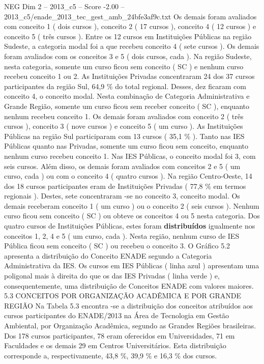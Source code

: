 \begin{textsample}{NEG Dim 2 – 2013\_c5 – Score -2.00 – 2013\_c5/enade\_2013\_tec\_gest\_amb\_24bfe3af9c.txt}
Os demais foram avaliados com conceito 1 ( dois cursos ), conceito 2 ( 17 cursos ), conceito 4 ( 12 cursos ) e conceito 5 ( três cursos ).
Entre os 12 cursos em Instituições Públicas na região Sudeste, a categoria modal foi a que recebeu conceito 4 ( sete cursos ).
Os demais foram avaliados com os conceitos 3 e 5 ( dois cursos, cada ).
Na região Sudeste, nesta categoria, somente um curso ficou sem conceito ( SC ) e nenhum curso recebeu conceito 1 ou 2.
As Instituições Privadas concentraram 24 dos 37 cursos participantes da região Sul, 64,9 \% do total regional.
Desses, dez ficaram com conceito 4, o conceito modal.
Nesta combinação de Categoria Administrativa e Grande Região, somente um curso ficou sem receber conceito ( SC ), enquanto nenhum recebeu conceito 1.
Os demais foram avaliados com conceito 2 ( três cursos ), conceito 3 ( nove cursos ) e conceito 5 ( um curso ).
As Instituições Públicas na região Sul participaram com 13 cursos ( 35,1 \% ).
Tanto nas IES Públicas quanto nas Privadas, somente um curso ficou sem conceito, enquanto nenhum curso recebeu conceito 1.
Nas IES Públicas, o conceito modal foi 3, com seis cursos.
Além disso, os demais foram avaliados com conceitos 2 e 5 ( um curso, cada ) ou com o conceito 4 ( quatro cursos ).
Na região Centro-Oeste, 14 dos 18 cursos participantes eram de Instituições Privadas ( 77,8 \% em termos regionais ).
Destes, sete concentraram -se no conceito 3, conceito modal.
Os demais receberam conceito 1 ( um curso ) ou o conceito 2 ( seis cursos ).
Nenhum curso ficou sem conceito ( SC ) ou obteve os conceitos 4 ou 5 nesta categoria.
Dos quatro cursos de Instituições Públicas, estes foram \textbf{distribuídos} igualmente nos conceitos 1, 2, 4 e 5 ( um curso, cada ).
Nesta região, nenhum curso de IES Pública ficou sem conceito ( SC ) ou recebeu o conceito 3.
O Gráfico 5.2 apresenta a distribuição do Conceito ENADE segundo a Categoria Administrativa da IES.
Os cursos em IES Públicas ( linha azul ) apresentam uma poligonal mais à direita do que os das IES Privadas ( linha verde ) e, consequentemente, uma distribuição de Conceitos ENADE com valores maiores. 5.3 CONCEITOS POR ORGANIZAÇÃO ACADÊMICA E POR GRANDE REGIÃO Na Tabela 5.3 encontra -se a distribuição dos conceitos atribuídos aos cursos participantes do ENADE/2013 na Área de Tecnologia em Gestão Ambiental, por Organização Acadêmica, segundo as Grandes Regiões brasileiras.
Dos 178 cursos participantes, 78 eram oferecidos em Universidades, 71 em Faculdades e os demais 29 em Centros Universitários.
Esta distribuição corresponde a, respectivamente, 43,8 \%, 39,9 \% e 16,3 \% dos cursos.

\end{textsample}
